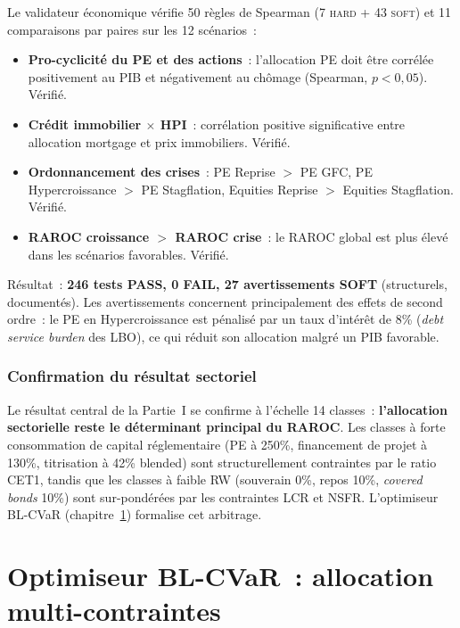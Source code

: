 \documentclass[12pt, a4paper, twoside, openright]{report}
\theoremstyle{definition}
\begin{document}
Le validateur économique vérifie 50 règles de Spearman (7 \textsc{hard} + 43 \textsc{soft}) et 11 comparaisons par paires sur les 12 scénarios~:

\begin{itemize}
\item \textbf{Pro-cyclicité du PE et des actions}~: l'allocation PE doit être corrélée positivement au PIB et négativement au chômage (Spearman, $p < 0{,}05$). Vérifié.
\item \textbf{Crédit immobilier $\times$ HPI}~: corrélation positive significative entre allocation mortgage et prix immobiliers. Vérifié.
\item \textbf{Ordonnancement des crises}~: PE Reprise $>$ PE GFC, PE Hypercroissance $>$ PE Stagflation, Equities Reprise $>$ Equities Stagflation. Vérifié.
\item \textbf{RAROC croissance $>$ RAROC crise}~: le RAROC global est plus élevé dans les scénarios favorables. Vérifié.
\end{itemize}

Résultat~: \textbf{246 tests PASS, 0 FAIL, 27 avertissements SOFT} (structurels, documentés). Les avertissements concernent principalement des effets de second ordre~: le PE en Hypercroissance est pénalisé par un taux d'intérêt de 8\% (\textit{debt service burden} des LBO), ce qui réduit son allocation malgré un PIB favorable.

\subsection{Confirmation du résultat sectoriel}

Le résultat central de la Partie~I se confirme à l'échelle 14 classes~: \textbf{l'allocation sectorielle reste le déterminant principal du RAROC}. Les classes à forte consommation de capital réglementaire (PE à 250\%, financement de projet à 130\%, titrisation à 42\% blended) sont structurellement contraintes par le ratio CET1, tandis que les classes à faible RW (souverain 0\%, repos 10\%, \textit{covered bonds} 10\%) sont sur-pondérées par les contraintes LCR et NSFR. L'optimiseur BL-CVaR (chapitre~\ref{chap:blcvar}) formalise cet arbitrage.


\chapter{Optimiseur BL-CVaR~: allocation multi-contraintes}
\label{chap:blcvar}
\end{document}
